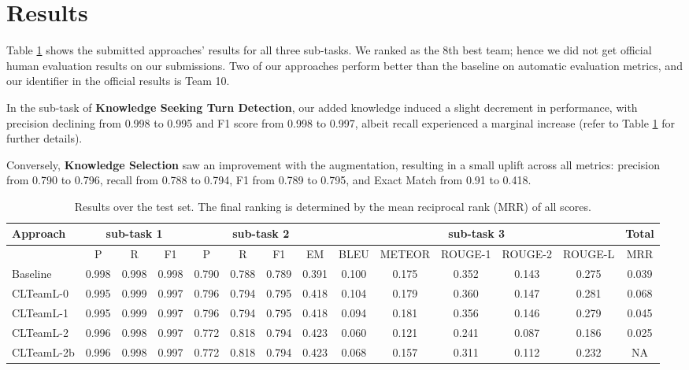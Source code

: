 \documentclass[11pt]{article}
\begin{document}
\section{Results}
Table \ref{table:results} shows the submitted approaches' results for all three sub-tasks. We ranked as the 8th best team; hence we did not get official human evaluation results on our submissions. Two of our approaches perform better than the baseline on automatic evaluation metrics, and our identifier in the official results is Team 10.

In the sub-task of \textbf{Knowledge Seeking Turn Detection}, our added knowledge induced a slight decrement in performance, with precision declining from 0.998 to 0.995 and F1 score from 0.998 to 0.997, albeit recall experienced a marginal increase (refer to Table \ref{table:results} for further details).

Conversely, \textbf{Knowledge Selection} saw an improvement with the augmentation, resulting in a small uplift across all metrics: precision from 0.790 to 0.796, recall from 0.788 to 0.794, F1 from 0.789 to 0.795, and Exact Match from 0.91 to 0.418.
\begin{table}[ht!]
\scriptsize{
    \centering
    \begin{tabular}{@{}lccc|cccc|ccccc|c@{}}
        \toprule
        \textbf{Approach} & \multicolumn{3}{c}{\textbf{sub-task 1}} & \multicolumn{4}{c}{\textbf{sub-task 2}} & \multicolumn{5}{c}{\textbf{sub-task 3}} & \textbf{Total}  \\
        \midrule
         & P & R & F1 & P & R & F1 & EM & BLEU & METEOR & ROUGE-1 & ROUGE-2 & ROUGE-L & MRR  \\
        \midrule
        Baseline & 0.998 & 0.998 & 0.998 & 0.790 & 0.788 & 0.789 & 0.391 & 0.100 & 0.175 & 0.352 & 0.143 & 0.275  & 0.039 \\
        \midrule
        CLTeamL-0 & 0.995 & 0.999 & 0.997 & 0.796 & 0.794 & 0.795 & 0.418 & 0.104 & 0.179 & 0.360 & 0.147 & 0.281 & 0.068 \\
        CLTeamL-1 & 0.995 & 0.999 & 0.997 & 0.796 & 0.794 & 0.795 & 0.418 & 0.094 & 0.181 & 0.356 & 0.146 & 0.279 & 0.045 \\
        CLTeamL-2 & 0.996 & 0.998 & 0.997 & 0.772 & 0.818 & 0.794 & 0.423 & 0.060 & 0.121 & 0.241 & 0.087 & 0.186 & 0.025 \\
        \midrule
        CLTeamL-2b & 0.996 & 0.998 & 0.997 & 0.772 & 0.818 & 0.794 & 0.423 & 0.068 & 0.157 & 0.311 & 0.112 & 0.232 & NA \\
        \bottomrule
    \end{tabular}
    \caption{Results over the test set. The final ranking is determined by the mean reciprocal rank (MRR) of all scores.}
    \label{table:results}}
\end{table}
\end{document}
